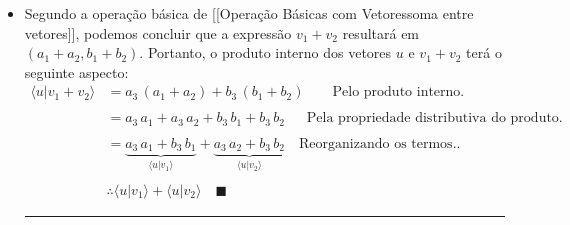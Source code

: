 \documentclass[
]{article}
\providecommand{\tightlist}{%
  \setlength{\itemsep}{0pt}\setlength{\parskip}{0pt}}
\begin{document}
\begin{itemize}
\tightlist
\item
  Segundo a operação básica de {[}{[}Operação Básicas com
  Vetores\textbar soma entre vetores{]}{]}, podemos concluir que a
  expressão \(v_1+v_2\) resultará em \((a_1+a_2,b_1+b_2)\). Portanto, o
  produto interno dos vetores \(u\) e \(v_1+v_2\) terá o seguinte
  aspecto:\[
    \begin{flalign*}
    \langle u|v_1+v_2\rangle&=a_3\,(a_1+a_2)+b_3\,(b_1+b_2)\qquad\text{Pelo produto interno.}&& \\ \\
    &=a_3\,a_1+a_3\,a_2+b_3\,b_1+b_3\,b_2\quad\;\;\text{Pela propriedade distributiva do produto.}&& \\ \\
    &=\underbrace{a_3\,a_1+b_3\,b_1}_{\langle u|v_1\rangle}+\underbrace{a_3\,a_2+b_3\,b_2}_{\langle u|v_2\rangle}\quad\text{Reorganizando os termos..}&& \\ \\
    &\therefore\langle u|v_1\rangle+\langle u|v_2\rangle\quad\blacksquare
    \end{flalign*}
    \]

  \begin{center}\rule{0.5\linewidth}{0.5pt}\end{center}


\end{itemize}
\end{document}
